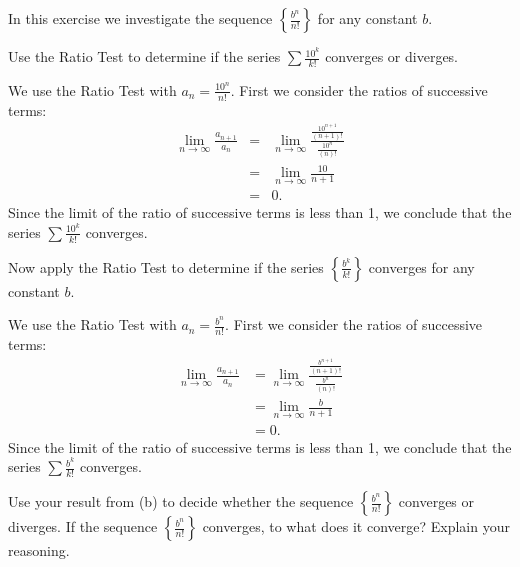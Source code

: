 \begin{exercises}

\item In this exercise we investigate the sequence $\left\{\frac{b^n}{n!}\right\}$ for any constant $b$.
    \ba
    \item Use the Ratio Test to determine if the series $\sum \frac{10^k}{k!}$ converges or diverges.

\begin{exerciseSolution}

\solution We use the Ratio Test with $a_n = \frac{10^n}{n!}$. First we consider the ratios of successive terms:
\begin{eqnarray*}
\lim_{n \to \infty} \frac{a_{n+1}}{a_n} &=& \lim_{n \to \infty} \frac{ \frac{10^{n+1}}{(n+1)!}}{ \frac{10^{n}}{(n)!} } \\
    &=& \lim_{n \to \infty} \frac{10}{n+1} \\
    &=& 0.
\end{eqnarray*}
Since the limit of the ratio of successive terms is less than 1, we conclude that the series $\sum \frac{10^k}{k!}$ converges.

\end{exerciseSolution}

\item Now apply the Ratio Test to determine if the series $\left\{\frac{b^k}{k!}\right\}$ converges for any constant $b$.

\begin{exerciseSolution}

\solution We use the Ratio Test with $a_n = \frac{b^n}{n!}$. First we consider the ratios of successive terms:
\begin{align*}
\lim_{n \to \infty} \frac{a_{n+1}}{a_n} &= \lim_{n \to \infty} \frac{ \frac{b^{n+1}}{(n+1)!} }{ \frac{b^{n}}{(n)!} } \\
    &= \lim_{n \to \infty} \frac{b}{n+1} \\
    &= 0.
\end{align*}
Since the limit of the ratio of successive terms is less than 1, we conclude that the series $\sum \frac{b^k}{k!}$ converges.

\end{exerciseSolution}

\item Use your result from (b) to decide whether the sequence  $\left\{\frac{b^n}{n!}\right\}$ converges or diverges. If the sequence $\left\{\frac{b^n}{n!}\right\}$ converges, to what does it converge? Explain your reasoning.


\end{exercises}
